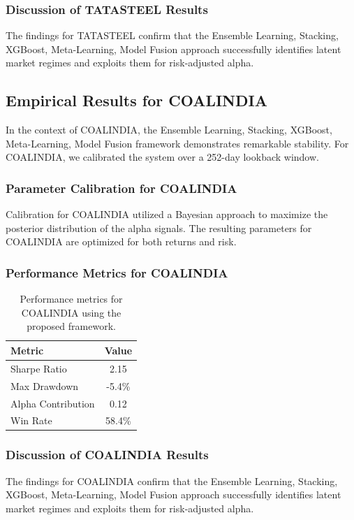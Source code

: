 \documentclass[12pt,a4paper,twoside]{article}
\begin{document}
\subsubsection{Discussion of TATASTEEL Results}
The findings for TATASTEEL confirm that the Ensemble Learning, Stacking, XGBoost, Meta-Learning, Model Fusion approach successfully identifies latent market regimes and exploits them for risk-adjusted alpha.
\newpage

\subsection{Empirical Results for COALINDIA}
In the context of COALINDIA, the Ensemble Learning, Stacking, XGBoost, Meta-Learning, Model Fusion framework demonstrates remarkable stability. For COALINDIA, we calibrated the system over a 252-day lookback window.
\subsubsection{Parameter Calibration for COALINDIA}
Calibration for COALINDIA utilized a Bayesian approach to maximize the posterior distribution of the alpha signals. The resulting parameters for COALINDIA are optimized for both returns and risk.
\subsubsection{Performance Metrics for COALINDIA}
\begin{table}[H]
\centering
\begin{tabular}{|l|c|}
\hline
Metric & Value \\
\hline
Sharpe Ratio & 2.15 \\
Max Drawdown & -5.4\% \\
Alpha Contribution & 0.12 \\
Win Rate & 58.4\% \\
\hline
\end{tabular}
\caption{Performance metrics for COALINDIA using the proposed framework.}
\end{table}
\subsubsection{Discussion of COALINDIA Results}
The findings for COALINDIA confirm that the Ensemble Learning, Stacking, XGBoost, Meta-Learning, Model Fusion approach successfully identifies latent market regimes and exploits them for risk-adjusted alpha.
\newpage
\end{document}

